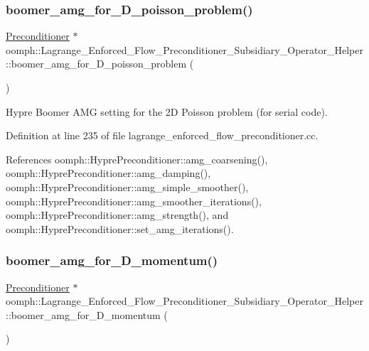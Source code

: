 \subsubsection{\texorpdfstring{boomer\+\_\+amg\+\_\+for\+\_\+D\+\_\+poisson\+\_\+problem()}{boomer\_amg\_for\_2D\_poisson\_problem()}}
{\footnotesize\ttfamily \hyperlink{classoomph_1_1Preconditioner}{Preconditioner} $\ast$ oomph\+::\+Lagrange\+\_\+\+Enforced\+\_\+\+Flow\+\_\+\+Preconditioner\+\_\+\+Subsidiary\+\_\+\+Operator\+\_\+\+Helper\+::boomer\+\_\+amg\+\_\+for\+\_\+D\+\_\+poisson\+\_\+problem (\begin{DoxyParamCaption}{ }\end{DoxyParamCaption})}



Hypre Boomer A\+MG setting for the 2D Poisson problem (for serial code). 



Definition at line 235 of file lagrange\+\_\+enforced\+\_\+flow\+\_\+preconditioner.\+cc.



References oomph\+::\+Hypre\+Preconditioner\+::amg\+\_\+coarsening(), oomph\+::\+Hypre\+Preconditioner\+::amg\+\_\+damping(), oomph\+::\+Hypre\+Preconditioner\+::amg\+\_\+simple\+\_\+smoother(), oomph\+::\+Hypre\+Preconditioner\+::amg\+\_\+smoother\+\_\+iterations(), oomph\+::\+Hypre\+Preconditioner\+::amg\+\_\+strength(), and oomph\+::\+Hypre\+Preconditioner\+::set\+\_\+amg\+\_\+iterations().

\mbox{\label{namespaceoomph_1_1Lagrange__Enforced__Flow__Preconditioner__Subsidiary__Operator__Helper_a3e3a8f1508491e564908310d6eb07a2d}} 
\subsubsection{\texorpdfstring{boomer\+\_\+amg\+\_\+for\+\_\+D\+\_\+momentum()}{boomer\_amg\_for\_3D\_momentum()}}
{\footnotesize\ttfamily \hyperlink{classoomph_1_1Preconditioner}{Preconditioner} $\ast$ oomph\+::\+Lagrange\+\_\+\+Enforced\+\_\+\+Flow\+\_\+\+Preconditioner\+\_\+\+Subsidiary\+\_\+\+Operator\+\_\+\+Helper\+::boomer\+\_\+amg\+\_\+for\+\_\+D\+\_\+momentum (\begin{DoxyParamCaption}{ }\end{DoxyParamCaption})}



